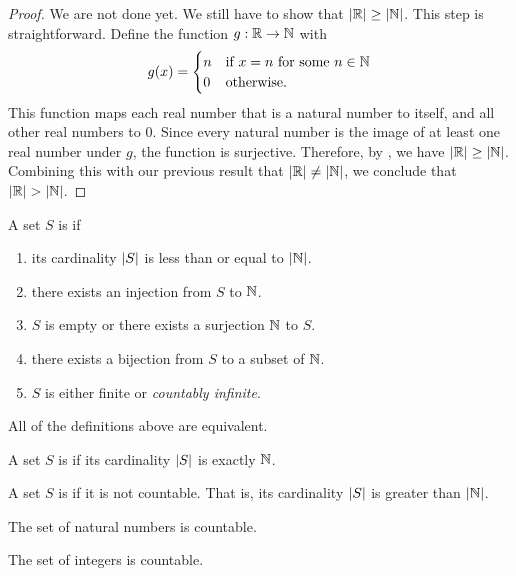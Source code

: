 \documentclass[11pt,twoside=off,numbers=noenddot]{scrbook}
\begin{document}
\begin{proof}
    We are not done yet. We still have to show that $| \mathbb R | \geq | \mathbb N |$. This step is straightforward. Define the function $g : \mathbb R \to \mathbb N$ with
    \begin{align*}
        g(x) = \begin{cases}
            n & \text{if $x = n$ for some $n \in \mathbb N$} \\
            0 & \text{otherwise}.
        \end{cases}
    \end{align*}
    This function maps each real number that is a natural number to itself, and all other real numbers to 0. Since every natural number is the image of at least one real number under $g$, the function is surjective. Therefore, by , we have $| \mathbb R | \geq | \mathbb N |$. Combining this with our previous result that $| \mathbb R | \neq | \mathbb N |$, we conclude that $| \mathbb R | > | \mathbb N |$.
\end{proof}

\begin{definition}
    A set $S$ is  if
    \begin{enumerate}
        \item its cardinality $| S |$ is less than or equal to $| \mathbb N |$.
        \item there exists an injection from $S$ to $\NN$.
        \item $S$ is empty or there exists a surjection $\NN$ to $S$.
        \item there exists a bijection from $S$ to a subset of $\NN$.
        \item $S$ is either finite or \textit{countably infinite}.
    \end{enumerate}
    All of the definitions above are equivalent.

    A set $S$ is  if its cardinality $| S |$ is exactly $\NN$.

    A set $S$ is  if it is not countable. That is, its cardinality $| S |$ is greater than $| \mathbb N |$.
\end{definition}

\begin{corollary}[$\NN$ is countable]
    The set of natural numbers is countable.
\end{corollary}

\begin{corollary}[$\ZZ$ is countable]
    The set of integers is countable.
\end{corollary}
\end{document}
